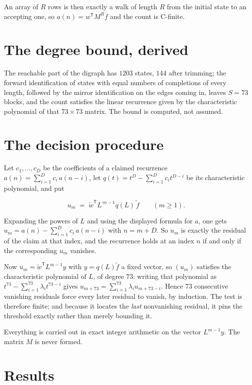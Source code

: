 \documentclass[11pt]{article}
\theoremstyle{definition}
\begin{document}
An array of $R$ rows is then exactly a walk of length $R$ from the initial state to an accepting one, so $a(n) = w^{\mathsf T}M^{R}f$ and the count is C-finite.

\section{The degree bound, derived}

The reachable part of the digraph has $1203$ states, $144$ after trimming; the forward identification of states with equal numbers of completions of every length, followed by the mirror identification on the edges coming in, leaves $S = 73$ blocks, and the count satisfies the linear recurrence given by the characteristic polynomial of that $73\times73$ matrix. The bound is computed, not assumed.

\section{The decision procedure}

Let $c_1,\dots,c_D$ be the coefficients of a claimed recurrence $a(n) = \sum_{i=1}^{D} c_i\,a(n-i)$, let $q(t) = t^{D} - \sum_{i=1}^{D} c_i t^{D-i}$ be its characteristic polynomial, and put

\[u_m \;=\; \tilde w^{\mathsf T} L^{\,m-1} q(L)\,\tilde f \qquad (m \ge 1).\]

Expanding the powers of $L$ and using the displayed formula for $a$, one gets $u_m = a(n) - \sum_{i=1}^{D} c_i\,a(n-i)$ with $n = m + D$. So $u_m$ is exactly the residual of the claim at that index, and the recurrence holds at an index $n$ if and only if the corresponding $u_m$ vanishes.

Now $u_m = \tilde w^{\mathsf T} L^{m-1} y$ with $y = q(L)\tilde f$ a fixed vector, so $(u_m)$ satisfies the characteristic polynomial of $L$, of degree $73$: writing that polynomial as $t^{73} - \sum_{i=1}^{73} \lambda_i t^{73-i}$ gives $u_{m+73} = \sum_{i=1}^{73} \lambda_i u_{m+73-i}$. Hence $73$ consecutive vanishing residuals force every later residual to vanish, by induction. The test is therefore finite; and because it locates the {\itshape last} nonvanishing residual, it pins the threshold exactly rather than merely bounding it.

Everything is carried out in exact integer arithmetic on the vector $L^{m-1}y$. The matrix $M$ is never formed.

\section{Results}
\end{document}
